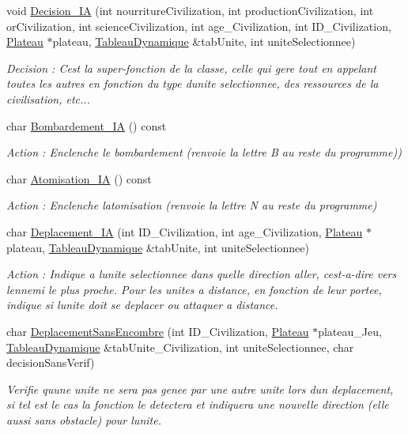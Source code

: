 \begin{DoxyCompactItemize}
void \hyperlink{classIA_a5b7bd62f9883f6959a636ca4bdd9b86a}{Decision\+\_\+\+IA} (int nourriture\+Civilization, int production\+Civilization, int or\+Civilization, int science\+Civilization, int age\+\_\+\+Civilization, int I\+D\+\_\+\+Civilization, \hyperlink{classPlateau}{Plateau} $\ast$plateau, \hyperlink{classTableauDynamique}{Tableau\+Dynamique} \&tab\+Unite, int unite\+Selectionnee)
\begin{DoxyCompactList}\small\item\em Decision \+: C\textquotesingle{}est la super-\/fonction de la classe, celle qui gere tout en appelant toutes les autres en fonction du type d\textquotesingle{}unite selectionnee, des ressources de la civilisation, etc... \end{DoxyCompactList}\item 
char \hyperlink{classIA_ac5712b300b84feed9fe00e04cd31cfbb}{Bombardement\+\_\+\+IA} () const
\begin{DoxyCompactList}\small\item\em Action \+: Enclenche le bombardement (renvoie la lettre B au reste du programme)) \end{DoxyCompactList}\item 
char \hyperlink{classIA_a2af0d4f87cb7d94d31d401516ad9761d}{Atomisation\+\_\+\+IA} () const
\begin{DoxyCompactList}\small\item\em Action \+: Enclenche l\textquotesingle{}atomisation (renvoie la lettre N au reste du programme) \end{DoxyCompactList}\item 
char \hyperlink{classIA_ae7743e41d836107d2e1cd1df6416ccd3}{Deplacement\+\_\+\+IA} (int I\+D\+\_\+\+Civilization, int age\+\_\+\+Civilization, \hyperlink{classPlateau}{Plateau} $\ast$plateau, \hyperlink{classTableauDynamique}{Tableau\+Dynamique} \&tab\+Unite, int unite\+Selectionnee)
\begin{DoxyCompactList}\small\item\em Action \+: Indique a l\textquotesingle{}unite selectionnee dans quelle direction aller, c\textquotesingle{}est-\/a-\/dire vers l\textquotesingle{}ennemi le plus proche. Pour les unites a distance, en fonction de leur portee, indique si l\textquotesingle{}unite doit se deplacer ou attaquer a distance. \end{DoxyCompactList}\item 
char \hyperlink{classIA_a8b6cc7f5e530f40def7f0490d5a29db7}{Deplacement\+Sans\+Encombre} (int I\+D\+\_\+\+Civilization, \hyperlink{classPlateau}{Plateau} $\ast$plateau\+\_\+\+Jeu, \hyperlink{classTableauDynamique}{Tableau\+Dynamique} \&tab\+Unite\+\_\+\+Civilization, int unite\+Selectionnee, char decision\+Sans\+Verif)
\begin{DoxyCompactList}\small\item\em Verifie qu\textquotesingle{}une unite ne sera pas genee par une autre unite lors d\textquotesingle{}un deplacement, si tel est le cas la fonction le detectera et indiquera une nouvelle direction (elle aussi sans obstacle) pour l\textquotesingle{}unite. \end{DoxyCompactList}\end{DoxyCompactItemize}


